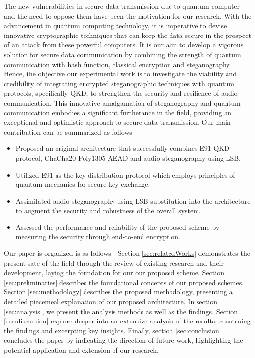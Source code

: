 \documentclass{article}
\begin{document}
The new vulnerabilities in secure data transmission due to quantum computer and the need to oppose them have been the motivation for our research. With the advancement in quantum computing technology, it is imperative to devise innovative cryptographic techniques that can keep the data secure in the prospect of an attack from these powerful computers. It is our aim to develop a vigorous solution for secure data communication by combining the strength of quantum communication with hash function, classical encryption and steganography. Hence, the objective our experimental work is to investigate the viability and credibility of integrating encrypted steganographic techniques with quantum protocols, specifically QKD, to strengthen the security and resilience of audio communication. This innovative amalgamation of steganography and quantum communication embodies a significant furtherance in the field, providing an exceptional and optimistic approach to secure data transmission. Our main contribution can be summarized as follows -
\begin{itemize}
    \item Proposed an original architecture that successfully combines E91 QKD protocol, ChaCha20-Poly1305 AEAD and audio steganography using LSB.
    \item Utilized E91 as the key distribution protocol which employs principles of quantum mechanics for secure key exchange.
    \item Assimilated audio steganography using LSB substitution into the architecture to augment the security and robustness of the overall system.
    \item Assessed the performance and reliability of the proposed scheme by measuring the security through end-to-end encryption.
\end{itemize}

Our paper is organized is as follows - Section \ref{sec:relatedWorks} demonstrates the present sate of the field through the review of existing research and their development, laying the foundation for our our proposed scheme. Section \ref{sec:preliminaries} describes the foundational concepts of our proposed schemes. Section \ref{sec:methodology} describes the proposed methodology, presenting a detailed piecemeal explanation of our proposed architecture. In section \ref{sec:analysis}, we present the analysis methods as well as the findings. Section \ref{sec:discussion} explore deeper into an extensive analysis of the results, construing the findings and excerpting key insights. Finally, section \ref{sec:conclusion} concludes the paper by indicating the direction of future work, highlighting the potential application and extension of our research.
\end{document}
